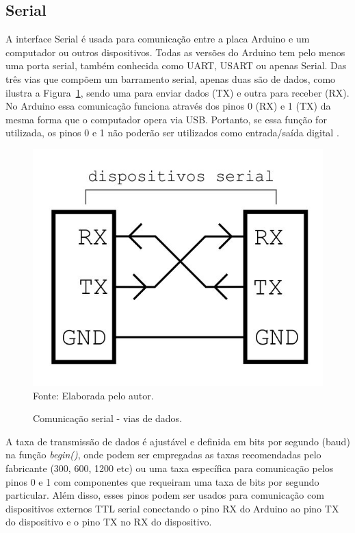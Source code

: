    
\subsection{Serial}
  
   A interface Serial é usada para comunicação entre a placa Arduino e um computador ou outros dispositivos. Todas as versões do Arduino tem pelo menos uma porta serial, também conhecida como UART, USART ou apenas Serial. Das três vias que compõem um barramento serial, apenas duas são de dados, como ilustra a Figura~\ref{serial}, sendo uma para enviar dados (TX) e outra para receber (RX). No Arduino essa comunicação funciona através dos pinos 0 (RX) e 1 (TX) da mesma forma que o computador opera via USB. Portanto, se essa função for utilizada, os pinos 0 e 1 não poderão ser utilizados como entrada/saída digital \cite{russell, arduinocc_serial}. 
  
  \begin{figure}[ht]
  \begin{center}
  \caption{Comunicação serial - vias de dados.}
  \includegraphics[scale=0.5]{figuras/cap2/serial.jpg}\\
  Fonte: Elaborada pelo autor.
  \label{serial}
  \end{center}
  \end{figure}


  A taxa de transmissão de dados é ajustável e definida em bits por segundo (baud) na função \textit{begin()}, onde podem ser empregadas as taxas recomendadas pelo fabricante (300, 600, 1200 etc) ou uma taxa específica para comunicação pelos pinos 0 e 1 com componentes que requeiram uma taxa de bits por segundo particular. Além disso, esses pinos podem ser usados para comunicação com dispositivos externos TTL serial conectando o pino RX do Arduino ao pino TX do dispositivo e o pino TX no RX do dispositivo.  

